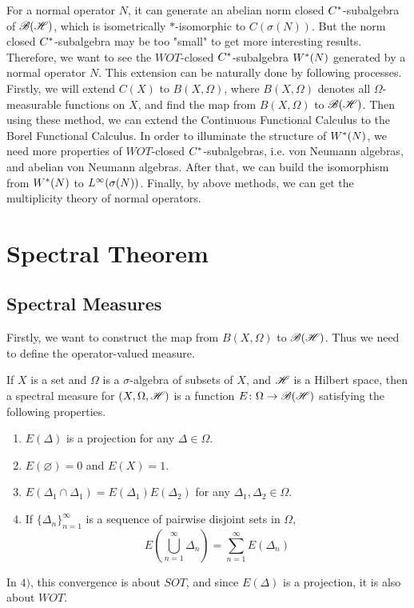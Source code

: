 \documentclass[a4paper,11pt]{report}
\begin{document}
For a normal operator $N$, it can generate an abelian norm closed $C^{*}$-subalgebra of $\mathscr{B(H)}$, which is isometrically $*$-isomorphic to $C(\sigma(N))$. But the norm closed $C^{*}$-subalgebra may be too "small" to get more interesting results. Therefore, we want to see the $WOT$-closed $C^{*}$-subalgebra $W^{*}(N)$ generated by a normal operator $N$. This extension can be naturally done by following processes. Firstly, we will extend $C(X)$ to $B(X,\Omega)$, where $B(X,\Omega)$ denotes all $\Omega$-measurable functions on $X$, and find the map from $B(X,\Omega)$ to $\mathscr{B(H)}$. Then using these method, we can extend the Continuous Functional Calculus to the Borel Functional Calculus. In order to illuminate the structure of $W^{*}(N)$, we need more properties of $WOT$-closed $C^{*}$-subalgebras, i.e. von Neumann algebras, and abelian von Neumann algebras. After that, we can build the isomorphism from $W^{*}(N)$ to $L^{\infty}(\sigma(N))$. Finally, by above methods, we can get the multiplicity theory of normal operators.

\section{Spectral Theorem}

\subsection{Spectral Measures}

Firstly, we want to construct the map from $B(X,\Omega)$ to $\mathscr{B(H)}$. Thus we need to define the operator-valued measure.

\begin{defn}
	If $X$ is a set and $\Omega$ is a $\sigma$-algebra of subsets of $X$, and $\mathscr{H}$ is a Hilbert space, then a spectral measure for $(X,\Omega,\mathscr{H})$ is a function $E \colon \Omega \rightarrow \mathscr{B(H)}$ satisfying the following properties.
	\begin{enumerate}[label=\arabic*)]
		\item $E(\Delta)$ is a projection for any $\Delta \in \Omega$.
		\item $E(\varnothing) = 0$ and $E(X) = 1$.
		\item $E(\Delta_1\cap\Delta_1)=E(\Delta_1)E(\Delta_2)$ for any $\Delta_1, \Delta_2 \in \Omega$.
		\item If $\{\Delta_n\}_{n=1}^{\infty}$ is a sequence of pairwise disjoint sets in $\Omega$,
		\begin{equation*}
			E(\bigcup_{n=1}^{\infty}\Delta_n) = \sum_{n=1}^{\infty} E(\Delta_n)
		\end{equation*}
	\end{enumerate}
\end{defn}
\begin{rem}
	In $4)$, this convergence is about $SOT$, and since $E(\Delta)$ is a projection, it is also about $WOT$.
\end{rem}
\end{document}
